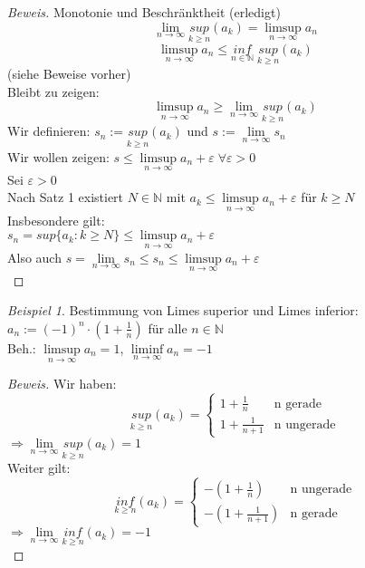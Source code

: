\documentclass[12pt,a4paper,titlepage]{article} %
\theoremstyle{definition}
\theoremstyle{remark}
\newtheorem*{bsp}{Beispiel}
\newenvironment{bew}{\begin{proof}[Beweis]}{\end{proof}}
\newcommand{\N}{\mathbb{N}}
\newcommand{\limes}[1]{\lim\limits_{#1\rightarrow\infty}}
\newcommand{\limessup}[1]{\limsup \limits_{#1\rightarrow\infty}}
\newcommand{\limesinf}[1]{\liminf \limits_{#1\rightarrow\infty}}
\begin{document}
	\begin{bew}
		Monotonie und Beschränktheit (erledigt)\\
		\[\limes{n} \underset{k \geq n}{sup} (a_k) = \limessup{n} a_n\]
		\[\limessup{n} a_n \leq \underset{n \in \N}{inf} \; \underset{k \geq n}{sup} (a_k)\]
		(siehe Beweise vorher)\\
		Bleibt zu zeigen:
		\[\limessup{n} a_n \geq \limes{n} \underset{k \geq n}{sup} (a_k)\]
		Wir definieren: \(s_n := \underset{k \geq n}{sup} (a_k)\) und \(s := \limes{n} s_n\)\\
		Wir wollen zeigen: \(s \leq \limessup{n} a_n + \varepsilon \; \forall \varepsilon > 0\)\\
		Sei \(\varepsilon > 0\)\\
		Nach Satz 1 existiert \(N \in \N\) mit \(a_k \leq \limessup{n} a_n + \varepsilon\) für \(k \geq N\)\\
		Insbesondere gilt:\\
		\(s_n = sup\{a_k: k \geq N\} \leq \limessup{n} a_n + \varepsilon\)\\
		Also auch \(s = \limes{n} s_n \leq s_n \leq \limessup{n} a_n + \varepsilon\)\\
	\end{bew}	
	\begin{bsp}
		Bestimmung von Limes superior und Limes inferior:\\
		\(a_n := (-1)^n \cdot (1 + \frac{1}{n})\) für alle \(n \in \N\)\\
		Beh.: \(\limessup{n} a_n = 1\), \(\limesinf{n} a_n = -1\)\\
		\begin{bew}
			Wir haben:
			\[\underset{k \geq n}{sup} (a_k) =\begin{cases}
			1 + \frac{1}{n} & \text{n gerade}\\
			1 + \frac{1}{n + 1} & \text{n ungerade}
			\end{cases} \]
			\(\Rightarrow \limes{n} \underset{k \geq n}{sup} (a_k) = 1\)\\
			Weiter gilt:
			\[\underset{k \geq n}{inf} (a_k) =\begin{cases}
			-(1 + \frac{1}{n} )& \text{n ungerade}\\
			-(1 + \frac{1}{n + 1}) & \text{n gerade}
			\end{cases} \]
			\(\Rightarrow \limes{n} \underset{k \geq n}{inf} (a_k) = -1\)\\
		\end{bew}
	\end{bsp}
\end{document}
